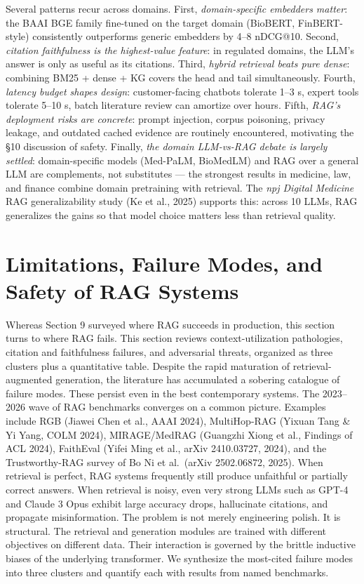 Several patterns recur across domains. First, \emph{domain-specific embedders matter}: the BAAI BGE family fine-tuned on the target domain (BioBERT, FinBERT-style) consistently outperforms generic embedders by 4--8 nDCG@10. Second, \emph{citation faithfulness is the highest-value feature}: in regulated domains, the LLM's answer is only as useful as its citations. Third, \emph{hybrid retrieval beats pure dense}: combining BM25 + dense + KG covers the head and tail simultaneously. Fourth, \emph{latency budget shapes design}: customer-facing chatbots tolerate 1--3 s, expert tools tolerate 5--10 s, batch literature review can amortize over hours. Fifth, \emph{RAG's deployment risks are concrete}: prompt injection, corpus poisoning, privacy leakage, and outdated cached evidence are routinely encountered, motivating the §10 discussion of safety. Finally, \emph{the domain LLM-vs-RAG debate is largely settled}: domain-specific models (Med-PaLM, BioMedLM) and RAG over a general LLM are complements, not substitutes --- the strongest results in medicine, law, and finance combine domain pretraining with retrieval. The \emph{npj Digital Medicine} RAG generalizability study (Ke et al., 2025) supports this: across 10 LLMs, RAG generalizes the gains so that model choice matters less than retrieval quality.

\section{Limitations, Failure Modes, and Safety of RAG Systems}\label{limitations-failure-modes-and-safety-of-rag-systems}

Whereas Section 9 surveyed where RAG succeeds in production, this section turns to where RAG fails. This section reviews context-utilization pathologies, citation and faithfulness failures, and adversarial threats, organized as three clusters plus a quantitative table. Despite the rapid maturation of retrieval-augmented generation, the literature has accumulated a sobering catalogue of failure modes. These persist even in the best contemporary systems. The 2023--2026 wave of RAG benchmarks converges on a common picture. Examples include RGB (Jiawei Chen et al., AAAI 2024), MultiHop-RAG (Yixuan Tang \& Yi Yang, COLM 2024), MIRAGE/MedRAG (Guangzhi Xiong et al., Findings of ACL 2024), FaithEval (Yifei Ming et al., arXiv 2410.03727, 2024), and the Trustworthy-RAG survey of Bo Ni et al.~(arXiv 2502.06872, 2025). When retrieval is perfect, RAG systems frequently still produce unfaithful or partially correct answers. When retrieval is noisy, even very strong LLMs such as GPT-4 and Claude 3 Opus exhibit large accuracy drops, hallucinate citations, and propagate misinformation. The problem is not merely engineering polish. It is structural. The retrieval and generation modules are trained with different objectives on different data. Their interaction is governed by the brittle inductive biases of the underlying transformer. We synthesize the most-cited failure modes into three clusters and quantify each with results from named benchmarks.

